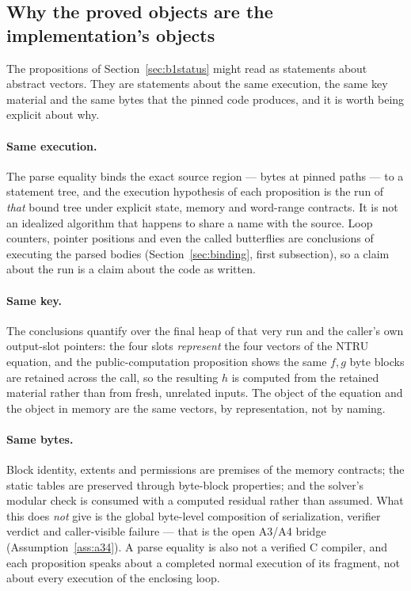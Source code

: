 \subsection{Why the proved objects are the implementation's objects}
The propositions of Section~\ref{sec:b1status} might read as statements
about abstract vectors. They are statements about the same execution,
the same key material and the same bytes that the pinned code produces,
and it is worth being explicit about why.

\paragraph{Same execution.}
The parse equality binds the exact source region --- bytes at pinned
paths --- to a statement tree, and the execution hypothesis of each
proposition is the run of \emph{that} bound tree under explicit state,
memory and word-range contracts. It is not an idealized algorithm that
happens to share a name with the source. Loop counters, pointer
positions and even the called butterflies are conclusions of executing
the parsed bodies (Section~\ref{sec:binding}, first subsection), so a
claim about the run is a claim about the code as written.

\paragraph{Same key.}
The conclusions quantify over the final heap of that very run and the
caller's own output-slot pointers: the four slots \emph{represent} the
four vectors of the NTRU equation, and the public-computation
proposition shows the same $f,g$ byte blocks are retained across the
call, so the resulting $h$ is computed from the retained material
rather than from fresh, unrelated inputs. The object of the equation
and the object in memory are the same vectors, by representation, not
by naming.

\paragraph{Same bytes.}
Block identity, extents and permissions are premises of the memory
contracts; the static tables are preserved through byte-block
properties; and the solver's modular check is consumed with a computed
residual rather than assumed. What this does \emph{not} give is the
global byte-level composition of serialization, verifier verdict and
caller-visible failure --- that is the open A3/A4 bridge
(Assumption~\ref{ass:a34}). A parse equality is also not a verified C
compiler, and each proposition speaks about a completed normal
execution of its fragment, not about every execution of the enclosing
loop.

